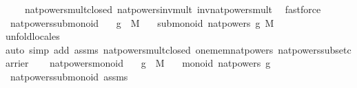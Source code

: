 \begin{isabellebody}
\ \ \ \ nat{\isacharunderscore}{\kern0pt}powers{\isacharunderscore}{\kern0pt}mult{\isacharunderscore}{\kern0pt}closed\ nat{\isacharunderscore}{\kern0pt}powers{\isacharunderscore}{\kern0pt}inv{\isacharunderscore}{\kern0pt}mult\ inv{\isacharunderscore}{\kern0pt}nat{\isacharunderscore}{\kern0pt}powers{\isacharunderscore}{\kern0pt}mult\ \isamarkupfalse%
\ fastforce%
\endisatagproof
{\isafoldproof}%
%
\isadelimproof
\isanewline
%
\endisadelimproof
\isanewline
{}\isamarkupfalse%
\ nat{\isacharunderscore}{\kern0pt}powers{\isacharunderscore}{\kern0pt}submonoid{\isacharcolon}{\kern0pt}\isanewline
\ \ \ {\isachardoublequoteopen}g\ {\isasymin}\ M{\isachardoublequoteclose}\isanewline
\ \ \ {\isachardoublequoteopen}submonoid\ {\isacharparenleft}{\kern0pt}nat{\isacharunderscore}{\kern0pt}powers\ g{\isacharparenright}{\kern0pt}\ M\ {\isacharparenleft}{\kern0pt}{\isasymcdot}{\isacharparenright}{\kern0pt}\ {\isasymone}{\isachardoublequoteclose}\isanewline
%
\isadelimproof
\ \ %
\endisadelimproof
%
\isatagproof
{}\isamarkupfalse%
{\isacharparenleft}{\kern0pt}unfold{\isacharunderscore}{\kern0pt}locales{\isacharparenright}{\kern0pt}\isanewline
\ \ \isamarkupfalse%
{\isacharparenleft}{\kern0pt}auto\ simp\ add{\isacharcolon}{\kern0pt}\ assms\ nat{\isacharunderscore}{\kern0pt}powers{\isacharunderscore}{\kern0pt}mult{\isacharunderscore}{\kern0pt}closed\ one{\isacharunderscore}{\kern0pt}mem{\isacharunderscore}{\kern0pt}nat{\isacharunderscore}{\kern0pt}powers\ nat{\isacharunderscore}{\kern0pt}powers{\isacharunderscore}{\kern0pt}subset{\isacharunderscore}{\kern0pt}carrier{\isacharparenright}{\kern0pt}\isanewline
\ \ \isamarkupfalse%
%
\endisatagproof
{\isafoldproof}%
%
\isadelimproof
\isanewline
%
\endisadelimproof
\isanewline
{}\isamarkupfalse%
\ nat{\isacharunderscore}{\kern0pt}powers{\isacharunderscore}{\kern0pt}monoid{\isacharcolon}{\kern0pt}\isanewline
\ \ \ {\isachardoublequoteopen}g\ {\isasymin}\ M{\isachardoublequoteclose}\isanewline
\ \ \ {\isachardoublequoteopen}monoid\ {\isacharparenleft}{\kern0pt}nat{\isacharunderscore}{\kern0pt}powers\ g{\isacharparenright}{\kern0pt}\ {\isacharparenleft}{\kern0pt}{\isasymcdot}{\isacharparenright}{\kern0pt}\ {\isasymone}{\isachardoublequoteclose}\isanewline
%
\isadelimproof
\ \ %
\endisadelimproof
%
\isatagproof
{}\isamarkupfalse%
\ nat{\isacharunderscore}{\kern0pt}powers{\isacharunderscore}{\kern0pt}submonoid\ assms\ \isamarkupfalse%

\end{isabellebody}
